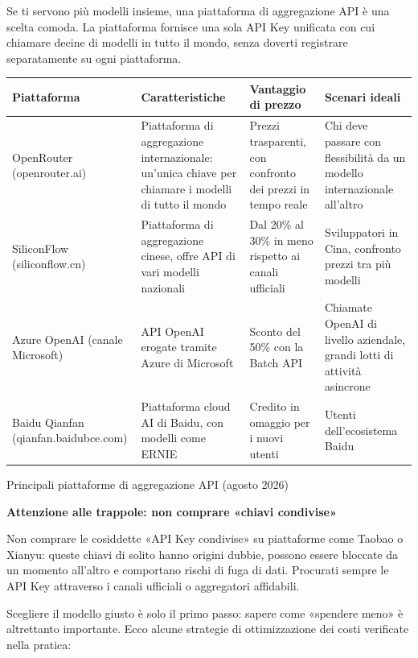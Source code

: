 
Se ti servono più modelli insieme, una piattaforma di aggregazione API è una scelta comoda. La piattaforma fornisce una sola API Key unificata con cui chiamare decine di modelli in tutto il mondo, senza doverti registrare separatamente su ogni piattaforma.

\begin{center}
\begin{tabularx}{\linewidth}{|X|X|X|X|}
\hline
\textbf{Piattaforma} & \textbf{Caratteristiche} & \textbf{Vantaggio di prezzo} & \textbf{Scenari ideali} \tabularnewline
\hline
OpenRouter (openrouter.ai) & Piattaforma di aggregazione internazionale: un'unica chiave per chiamare i modelli di tutto il mondo & Prezzi trasparenti, con confronto dei prezzi in tempo reale & Chi deve passare con flessibilità da un modello internazionale all'altro \tabularnewline
SiliconFlow (siliconflow.cn) & Piattaforma di aggregazione cinese, offre API di vari modelli nazionali & Dal 20\% al 30\% in meno rispetto ai canali ufficiali & Sviluppatori in Cina, confronto prezzi tra più modelli \tabularnewline
Azure OpenAI (canale Microsoft) & API OpenAI erogate tramite Azure di Microsoft & Sconto del 50\% con la Batch API & Chiamate OpenAI di livello aziendale, grandi lotti di attività asincrone \tabularnewline
Baidu Qianfan (qianfan.baidubce.com) & Piattaforma cloud AI di Baidu, con modelli come ERNIE & Credito in omaggio per i nuovi utenti & Utenti dell'ecosistema Baidu \tabularnewline
\hline
\end{tabularx}
\end{center}

\begin{center}\small\color{gray}Principali piattaforme di aggregazione API (agosto 2026)\end{center}

\textbf{Attenzione alle trappole: non comprare «chiavi condivise»}\par

Non comprare le cosiddette «API Key condivise» su piattaforme come Taobao o Xianyu: queste chiavi di solito hanno origini dubbie, possono essere bloccate da un momento all'altro e comportano rischi di fuga di dati. Procurati sempre le API Key attraverso i canali ufficiali o aggregatori affidabili.


Scegliere il modello giusto è solo il primo passo: sapere come «spendere meno» è altrettanto importante. Ecco alcune strategie di ottimizzazione dei costi verificate nella pratica:

